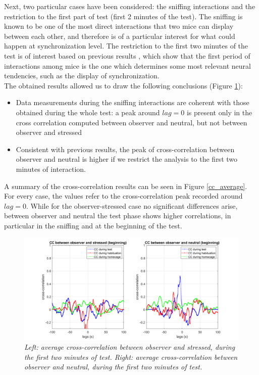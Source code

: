 \documentclass[12pt, a4paper]{report}
\begin{document}
Next, two particular cases have been considered: the sniffing interactions and the restriction to the first part of test (first 2 minutes of the test). The sniffing is known to be one of the most direct interactions that two mice can display between each other, and therefore is of a particular interest for what could happen at synchronization level. The restriction to the first two minutes of the test is of interest based on previous results \cite{16}, which show that the first period of interactions among mice is the one which determines some most relevant neural tendencies, such as the display of synchronization.\\
The obtained results allowed us to draw the following conclusions (Figure \ref{initial}):

\begin{itemize}
	\item Data measurements during the sniffing interactions are coherent with those obtained during the whole test: a peak around $lag=0$ is present only in the cross correlation computed between observer and neutral, but not between observer and stressed
	
	\item Consistent with previous results, the peak of cross-correlation between observer and neutral is higher if we restrict the analysis to the first two minutes of interaction.
	
\end{itemize}

A summary of the cross-correlation results can be seen in Figure \ref{cc_average}. For every case, the values refer to the cross-correlation peak recorded around $lag=0$. While for the observer-stressed case no significant differences arise, between observer and neutral the test phase shows higher correlations, in particular in the sniffing and at the beginning of the test.



\begin{figure}[H]
	
	\begin{center}
		\hspace*{-1.4cm}
		\includegraphics[scale=.5]{average_cc_initial.png} 
	\end{center} 
	\caption{\textit{Left: average cross-correlation between observer and stressed, during the first two minutes of test. Right: average cross-correlation between observer and neutral, during the first two minutes of test.}}
	\label{initial}
\end{figure}
\end{document}
